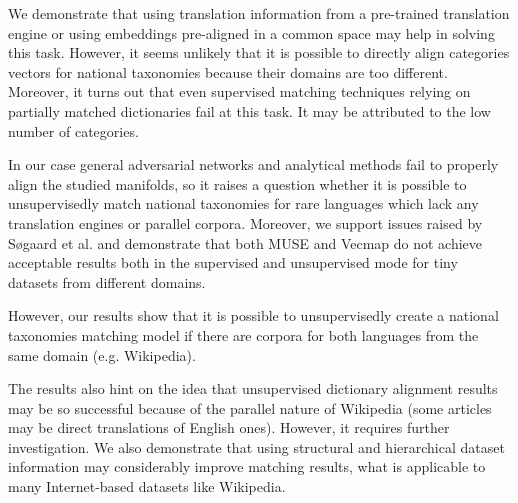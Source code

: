 \documentclass[conference]{IEEEtran}
\begin{document}
We demonstrate that using translation information from a pre-trained translation engine or using embeddings pre-aligned in a common space may help in solving this task. However, it seems unlikely that it is possible to directly align categories vectors for national taxonomies because their domains are too different. Moreover, it turns out that even supervised matching techniques relying on partially matched dictionaries fail at this task. It may be attributed to the low number of categories.

In our case general adversarial networks and analytical methods fail to properly align the studied manifolds, so it raises a question whether it is possible to unsupervisedly match national taxonomies for rare languages which lack any translation engines or parallel corpora. Moreover, we support issues raised by Søgaard et al. \cite{ruder-muse-limitations} and demonstrate that both MUSE and Vecmap do not achieve acceptable results both in the supervised and unsupervised mode for tiny datasets from different domains.

However, our results show that it is possible to unsupervisedly create a national taxonomies matching model if there are corpora for both languages from the same domain (e.g. Wikipedia).

The results also hint on the idea that unsupervised dictionary alignment results may be so successful because of the parallel nature of Wikipedia (some articles may be direct translations of English ones). However, it requires further investigation.
We also demonstrate that using structural and hierarchical dataset information may considerably improve matching results, what is applicable to many Internet-based datasets like Wikipedia.
%
%

\printbibliography
\end{document}
